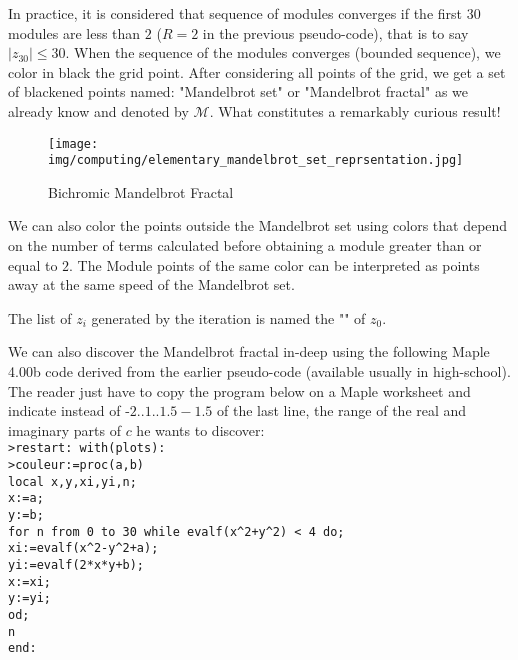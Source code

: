 	In practice, it is considered that sequence of modules converges if the first $30$ modules are less than $2$ ($R=2$ in the previous pseudo-code), that is to say $|z_{30}|\leq 30$. When the sequence of the modules converges (bounded sequence), we color in black the grid point. After considering all points of the grid, we get a set of blackened points named: "Mandelbrot set" or "Mandelbrot fractal" as we already know and denoted by $\mathcal{M}$. What constitutes a remarkably curious result!
	\begin{figure}[H]
		\centering
		\texttt{[image: img/computing/elementary\_mandelbrot\_set\_reprsentation.jpg]}
		\caption{Bichromic Mandelbrot Fractal}
	\end{figure}
	We can also color the points outside the Mandelbrot set using colors that depend on the number of terms calculated before obtaining a module greater than or equal to $2$. The Module points of the same color can be interpreted as points away at the same speed of the Mandelbrot set.
	\begin{tcolorbox}[title=Remark,colframe=black,arc=10pt]
	The list of $z_i$ generated by the iteration is named the "" of $z_0$.
	\end{tcolorbox}
	We can also discover the Mandelbrot fractal in-deep using the following Maple 4.00b code derived from the earlier pseudo-code (available usually in high-school). The reader just have to copy the program below on a Maple worksheet and indicate instead of -$2 .. 1 .. 1.5 -1.5$ of the last line, the range of the real and imaginary parts of $c$ he wants to discover:\\
	
	 \texttt{>restart: with(plots):\\
	>couleur:=proc(a,b)\\
	local x,y,xi,yi,n;\\
	x:=a;\\
	y:=b;\\
	for n from 0 to 30 while evalf(x\string ^2+y\string ^2) < 4 do;\\
	   xi:=evalf(x\string ^2-y\string ^2+a);\\
	   yi:=evalf(2*x*y+b);\\
	   x:=xi;\\
	   y:=yi;\\
	od;\\
	n\\
	end:}
	
